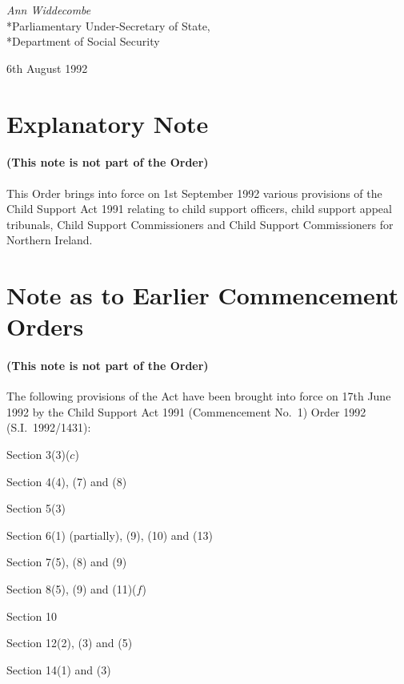 \documentclass[a4paper]{article}
\newcommand{\parthead}{}
\begin{document}
{\raggedleft
\emph{Ann Widdecombe}\\*Parliamentary Under-Secretary of State,\\*Department of Social Security

}

6th August 1992

\part{Explanatory Note}

\renewcommand\parthead{--- Explanatory Note}

\subsection*{(This note is not part of the Order)}

 This Order brings into force on 1st September 1992 various provisions of the Child Support Act 1991 relating to child support officers, child support appeal tribunals, Child Support Commissioners and Child Support Commissioners for Northern Ireland.

\part{Note as to Earlier Commencement Orders}

\renewcommand\parthead{--- Note as to Earlier Commencement Orders}

\subsection*{(This note is not part of the Order)}

 The following provisions of the Act have been brought into force on 17th June 1992 by the Child Support Act 1991 (Commencement No.\ 1) Order 1992 (S.I.\ 1992/1431):

  Section 3(3)($c$)

  Section 4(4), (7) and (8)

  Section 5(3)

  Section 6(1) (partially), (9), (10) and (13)

  Section 7(5), (8) and (9)

  Section 8(5), (9) and (11)($f$)

  Section 10

  Section 12(2), (3) and (5)

  Section 14(1) and (3)
\end{document}
